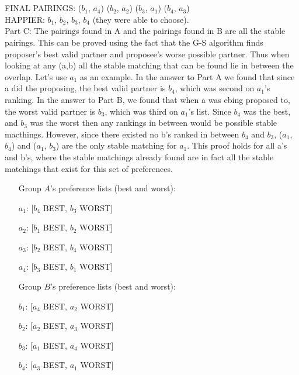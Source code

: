 \documentclass[10pt]{article}
\begin{document}
{\begin{tabular}{c|c|c}
 \end{tabular}
  \\
  \\
  FINAL PAIRINGS:
  ($b_1$, $a_4$)
  ($b_2$, $a_2$)
  ($b_3$, $a_1$)
  ($b_4$, $a_3$) 
  \\

  HAPPIER: $b_1$, $b_2$, $b_3$, $b_4$ (they were able to choose). \\

Part C:
  The pairings found in A and the pairings found in B are all the stable pairings. This can be proved using the fact 
  that the G-S algorithm finds proposer's best valid partner and proposee's worse possible partner. Thus when looking 
  at any (a,b) all the stable matching that can be found lie in between the overlap. Let's use $a_1$ as an example. 
  In the answer to Part A we found that since a did the proposing, the best valid partner is $b_4$, which was second on $a_1$'s ranking.
  In the answer to Part B, we found that when a was ebing proposed to, the worst valid partner is $b_3$, which was third on $a_1$'s list. 
  Since $b_4$ was the best, and $b_3$ was the worst then any rankings in between would be possible stable macthings. However, since 
  there existed no b's ranked in between $b_4$ and $b_3$, ($a_1$, $b_4$) and ($a_1$, $b_3$) are the only stable matching for $a_1$. 
  This proof holds for all a's and b's, where the stable matchings already found are in fact all the stable matchings that exist for this 
  set of preferences.  

  \begin{enumerate}
    \item[] Group $A$'s preference lists (best and worst):
    \item[$a_1$:] [$b_4$ BEST, $b_3$ WORST]
    \item[$a_2$:] [$b_1$ BEST, $b_2$ WORST]
    \item[$a_3$:] [$b_2$ BEST, $b_4$ WORST]
    \item[$a_4$:] [$b_3$ BEST, $b_1$ WORST]
  \end{enumerate}
   
  \begin{enumerate}
    \item[]  Group $B$'s preference lists (best and worst):
    \item[$b_1$:] [$a_4$ BEST, $a_2$ WORST]
    \item[$b_2$:] [$a_2$ BEST, $a_3$ WORST]
    \item[$b_3$:] [$a_1$ BEST, $a_4$ WORST]
    \item[$b_4$:] [$a_3$ BEST, $a_1$ WORST]
  \end{enumerate}

}
\end{document}
